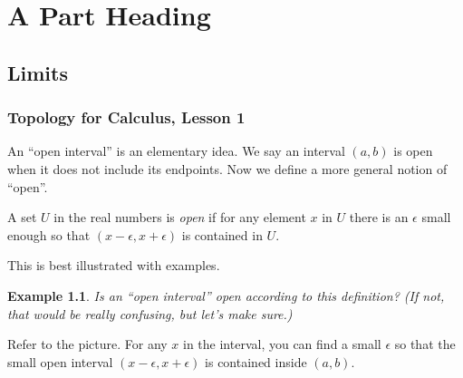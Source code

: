 \documentclass[11pt]{book}
\newenvironment{definition}[1][Definition]{\begin{trivlist}
\item[\hskip \labelsep {\bfseries #1}]}{\end{trivlist}}
\newtheorem{example}{Example}
\numberwithin{example}{chapter}
\begin{document}
\clearpage






\tableofcontents                        %








\mainmatter                             %

\part{A Part Heading}                   %



\chapter{Limits}     

\section{}

\section{Topology for Calculus, Lesson 1}



An ``open interval'' is an elementary idea.  We say an interval $(a,b)$ is open when it does not include its endpoints.  Now we define a more general notion of ``open''.  




\begin{definition}
A set $U$ in the real numbers is \emph{open} if for any element $x$ in $U$ there is an $\epsilon$ small enough so that $(x-\epsilon , x+\epsilon)$ is contained in $U$.  


\end{definition}



This is best illustrated with examples.  

\begin{example}
Is an ``open interval'' \emph{ open} according to this definition?  (If not, that would be really confusing, but let's make sure.)
\end{example}

Refer to the picture.  For any $x$ in the interval, you can find a small $\epsilon$ so that the small open interval $(x-\epsilon , x+\epsilon)$ is contained inside $(a,b)$. 
\end{document}
